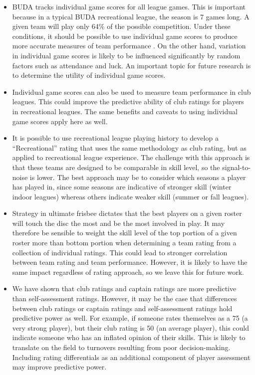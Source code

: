 \begin{itemize}

\item BUDA tracks individual game scores for all league games. This is important because in a typical BUDA recreational league, the season is 7 games long. A given team will play only 64\% of the possible competition. Under these conditions, it should be possible to use individual game scores to produce more accurate measures of team performance \cite{Langville_2012}. On the other hand, variation in individual game scores is likely to be influenced significantly by random factors such as attendance and luck. An important topic for future research is to determine the utility of individual game scores.

\item Individual game scores can also be used to measure team performance in club leagues. This could improve the predictive ability of club ratings for players in recreational leagues. The same benefits and caveats to using individual game scores apply here as well.

\item It is possible to use recreational league playing history to develop a ``Recreational'' rating that uses the same methodology as club rating, but as applied to recreational league experience. The challenge with this approach is that these teams are designed to be comparable in skill level, so the signal-to-noise is lower. The best approach may be to consider which seasons a player has played in, since some seasons are indicative of stronger skill (winter indoor leagues) whereas others indicate weaker skill (summer or fall leagues).

\item Strategy in ultimate frisbee dictates that the best players on a given roster will touch the disc the most and be the most involved in play.  It may therefore be sensible to weight the skill level of the top portion of a given roster more than bottom portion when determining a team rating from a collection of individual ratings. This could lead to stronger correlation between team rating and team performance. However, it is likely to have the same impact regardless of rating approach, so we leave this for future work.

\item We have shown that club ratings and captain ratings are more predictive than self-assessment ratings. However, it may be the case that differences between club ratings or captain ratings and self-assessment ratings hold predictive power as well. For example, if someone rates themselves as a 75 (a very strong player), but their club rating is 50 (an average player), this could indicate someone who has an inflated opinion of their skills. This is likely to translate on the field to turnovers resulting from poor decision-making.  Including rating differentials as an additional component of player assessment may improve predictive power.


\end{itemize}
